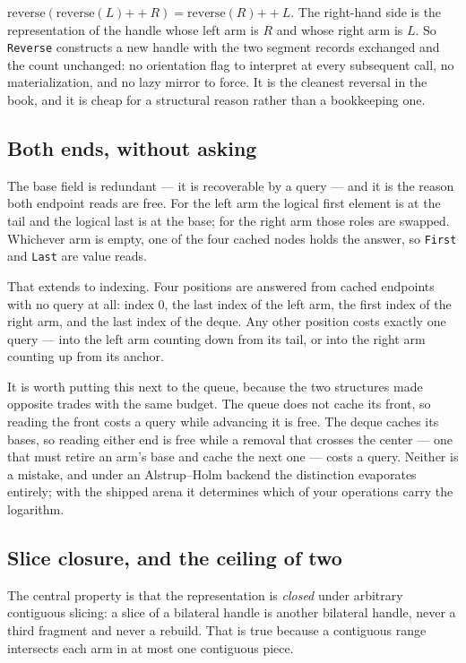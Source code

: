 \documentclass[11pt,twoside,openright]{book}
\newcommand{\code}[1]{\texorpdfstring{\textcolor{d7ink}{\texttt{#1}}}{#1}}
\begin{document}
$\mathrm{reverse}(\mathrm{reverse}(L) \mathbin{+\!\!+} R) = \mathrm{reverse}(R)
\mathbin{+\!\!+} L$. The right-hand side is the representation of the handle
whose left arm is $R$ and whose right arm is $L$. So \code{Reverse} constructs a
new handle with the two segment records exchanged and the count unchanged: no
orientation flag to interpret at every subsequent call, no materialization, and
no lazy mirror to force. It is the cleanest reversal in the book, and it is
cheap for a structural reason rather than a bookkeeping one.

\subsection{Both ends, without asking}

The \textsf{base} field is redundant --- it is recoverable by a query --- and it
is the reason both endpoint reads are free. For the left arm the logical first
element is at the tail and the logical last is at the base; for the right arm
those roles are swapped. Whichever arm is empty, one of the four cached nodes
holds the answer, so \code{First} and \code{Last} are value reads.

That extends to indexing. Four positions are answered from cached endpoints with
no query at all: index $0$, the last index of the left arm, the first index of
the right arm, and the last index of the deque. Any other position costs exactly
one query --- into the left arm counting down from its tail, or into the right
arm counting up from its anchor.

It is worth putting this next to the queue, because the two structures made
opposite trades with the same budget. The queue does not cache its front, so
reading the front costs a query while advancing it is free. The deque caches its
bases, so reading either end is free while a removal that crosses the center ---
one that must retire an arm's base and cache the next one --- costs a query.
Neither is a mistake, and under an Alstrup--Holm backend the distinction
evaporates entirely; with the shipped arena it determines which of your
operations carry the logarithm.

\subsection{Slice closure, and the ceiling of two}

The central property is that the representation is \emph{closed} under
arbitrary contiguous slicing: a slice of a bilateral handle is another
bilateral handle, never a third fragment and never a rebuild. That is true
because a contiguous range intersects each arm in at most one contiguous piece.
\end{document}
